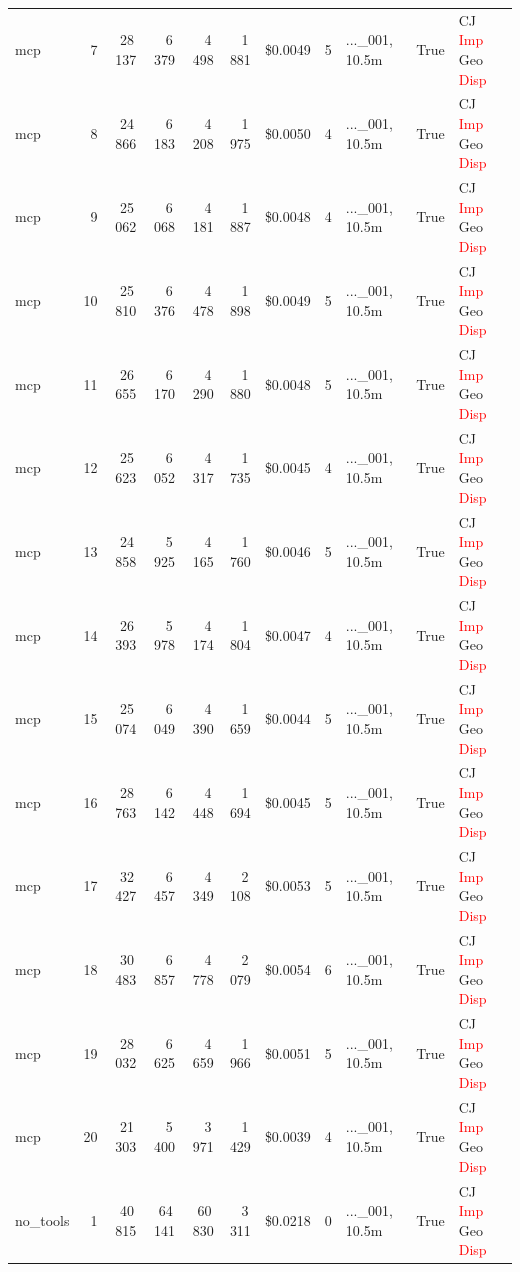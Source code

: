\documentclass[a4paper,11pt]{article}
\begin{document}
\begin{table}[H]
{\begin{tabular}{l r r r r r r r l r l}
mcp & 7 & 28\,137 & 6\,379 & 4\,498 & 1\,881 & \$0.0049 & 5 & ...\_001, 10.5m & True & CJ \textcolor{red}{Imp} Geo \textcolor{red}{Disp} \\
mcp & 8 & 24\,866 & 6\,183 & 4\,208 & 1\,975 & \$0.0050 & 4 & ...\_001, 10.5m & True & CJ \textcolor{red}{Imp} Geo \textcolor{red}{Disp} \\
mcp & 9 & 25\,062 & 6\,068 & 4\,181 & 1\,887 & \$0.0048 & 4 & ...\_001, 10.5m & True & CJ \textcolor{red}{Imp} Geo \textcolor{red}{Disp} \\
mcp & 10 & 25\,810 & 6\,376 & 4\,478 & 1\,898 & \$0.0049 & 5 & ...\_001, 10.5m & True & CJ \textcolor{red}{Imp} Geo \textcolor{red}{Disp} \\
mcp & 11 & 26\,655 & 6\,170 & 4\,290 & 1\,880 & \$0.0048 & 5 & ...\_001, 10.5m & True & CJ \textcolor{red}{Imp} Geo \textcolor{red}{Disp} \\
mcp & 12 & 25\,623 & 6\,052 & 4\,317 & 1\,735 & \$0.0045 & 4 & ...\_001, 10.5m & True & CJ \textcolor{red}{Imp} Geo \textcolor{red}{Disp} \\
mcp & 13 & 24\,858 & 5\,925 & 4\,165 & 1\,760 & \$0.0046 & 5 & ...\_001, 10.5m & True & CJ \textcolor{red}{Imp} Geo \textcolor{red}{Disp} \\
mcp & 14 & 26\,393 & 5\,978 & 4\,174 & 1\,804 & \$0.0047 & 4 & ...\_001, 10.5m & True & CJ \textcolor{red}{Imp} Geo \textcolor{red}{Disp} \\
mcp & 15 & 25\,074 & 6\,049 & 4\,390 & 1\,659 & \$0.0044 & 5 & ...\_001, 10.5m & True & CJ \textcolor{red}{Imp} Geo \textcolor{red}{Disp} \\
mcp & 16 & 28\,763 & 6\,142 & 4\,448 & 1\,694 & \$0.0045 & 5 & ...\_001, 10.5m & True & CJ \textcolor{red}{Imp} Geo \textcolor{red}{Disp} \\
mcp & 17 & 32\,427 & 6\,457 & 4\,349 & 2\,108 & \$0.0053 & 5 & ...\_001, 10.5m & True & CJ \textcolor{red}{Imp} Geo \textcolor{red}{Disp} \\
mcp & 18 & 30\,483 & 6\,857 & 4\,778 & 2\,079 & \$0.0054 & 6 & ...\_001, 10.5m & True & CJ \textcolor{red}{Imp} Geo \textcolor{red}{Disp} \\
mcp & 19 & 28\,032 & 6\,625 & 4\,659 & 1\,966 & \$0.0051 & 5 & ...\_001, 10.5m & True & CJ \textcolor{red}{Imp} Geo \textcolor{red}{Disp} \\
mcp & 20 & 21\,303 & 5\,400 & 3\,971 & 1\,429 & \$0.0039 & 4 & ...\_001, 10.5m & True & CJ \textcolor{red}{Imp} Geo \textcolor{red}{Disp} \\
\midrule
no\_tools & 1 & 40\,815 & 64\,141 & 60\,830 & 3\,311 & \$0.0218 & 0 & ...\_001, 10.5m & True & CJ \textcolor{red}{Imp} Geo \textcolor{red}{Disp} \\

\end{tabular}}
\end{table}
\end{document}
